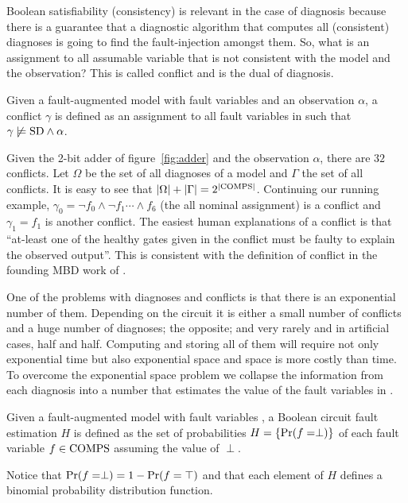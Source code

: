 \documentclass{article}
\begin{document}
%
Boolean satisfiability (consistency) is relevant in the case of
diagnosis because there is a guarantee that a diagnostic algorithm
that computes all (consistent) diagnoses is going to find the
fault-injection amongst them. So, what is an assignment to all
assumable variable that is not consistent with the model and the
observation? This is called conflict and is the dual of diagnosis.
%
\begin{definition}[Conflict]
  Given a fault-augmented model \sd with fault variables \comps and an
  observation $\alpha$, a conflict $\gamma$ is defined as an
  assignment to all fault variables in \comps such that $\gamma
  \not\models \mathrm{SD} \wedge \alpha$.
\end{definition}
%
Given the 2-bit adder of figure~\ref{fig:adder} and the observation
$\alpha$, there are $32$ conflicts. Let $\Omega$ be the set of all
diagnoses of a model and $\Gamma$ the set of all conflicts. It is easy
to see that $|\Omega| + |\Gamma| = 2^{|\mathrm{COMPS}|}$. Continuing our
running example, $\gamma_0 = \neg{f_0} \wedge \neg{f_1} \cdots
\wedge{f_6}$ (the all nominal assignment) is a conflict and $\gamma_1
= f_1$ is another conflict. The easiest human explanations of a
conflict is that ``at-least one of the healthy gates given in the
conflict must be faulty to explain the observed output''. This is
consistent with the definition of conflict in the founding MBD work of
\cite{?}. 
\par
One of the problems with diagnoses and conflicts is that there is an
exponential number of them. Depending on the circuit it is either a
small number of conflicts and a huge number of diagnoses; the
opposite; and very rarely and in artificial cases, half and
half. Computing and storing all of them will require not only
exponential time but also exponential space and space is more costly
than time. To overcome the exponential space problem we collapse the
information from each diagnosis into a number that estimates the value
of the fault variables in \comps.
%
\begin{definition}
  Given a fault-augmented model \sd with fault variables \comps, a
  Boolean circuit fault estimation $H$ is defined as the set of
  probabilities $H = \{\mbox{Pr}(f = \perp)\}$ of each fault variable $f \in
  \mathrm{COMPS}$ assuming the value of $\perp$.
\end{definition}
%
Notice that $\mbox{Pr}(f = \perp) = 1 - \mbox{Pr}(f = \top)$ and that each element
of $H$ defines a binomial probability distribution function.
\par
\end{document}
